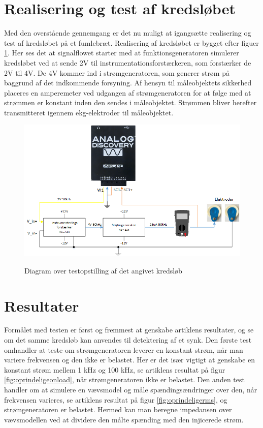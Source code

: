 \section{Realisering og test af kredsløbet}

Med den overstående gennemgang er det nu muligt at igangsætte  realisering og test af kredsløbet på et fumlebræt. Realisering af kredsløbet er bygget efter figuer \ref{fig:testopstilling1}. Her ses det at signalflowet starter med at funktionsgeneratoren simulerer kredsløbet ved at sende 2V til instrumentationsforstærkeren, som forstærker de 2V til 4V. De 4V kommer ind i strømgeneratoren, som generer strøm på baggrund af det indkommende forsyning. Af hensyn til måleobjektets sikkerhed placeres en amperemeter ved udgangen af strømgeneratoren for at følge med at strømmen er konstant inden den sendes i måleobjektet. Strømmen bliver herefter transmitteret igennem ekg-elektroder til måleobjektet.      



\begin{figure}[H]
\centering
{\includegraphics[width=\linewidth]
{Figure/testopstilling11}}
\caption{Diagram over testopstilling af det angivet kredsløb}
\label{fig:testopstilling1}
\end{figure}


\section{Resultater}
Formålet med testen er først og fremmest at genskabe artiklens resultater, og se om det samme kredsløb kan anvendes til detektering af et synk. Den første test omhandler at teste om strømgeneratoren leverer en konstant strøm, når man variere frekvensen og den ikke er belastet. Her er det især vigtigt at genskabe en konstant strøm mellem 1 kHz og 100 kHz, se artiklens resultat på figur \ref{fig:oprindeligeonload}, når strømgeneratoren ikke er belastet. Den anden test handler om at simulere en vævsmodel og måle spændingsændringer over den, når frekvensen varieres, se artiklens resultat på figur \ref{fig:oprindeligerms}, og strømgeneratoren er belastet. Hermed kan man beregne impedansen over vævsmodellen ved at dividere den målte spænding med den injicerede strøm.  




